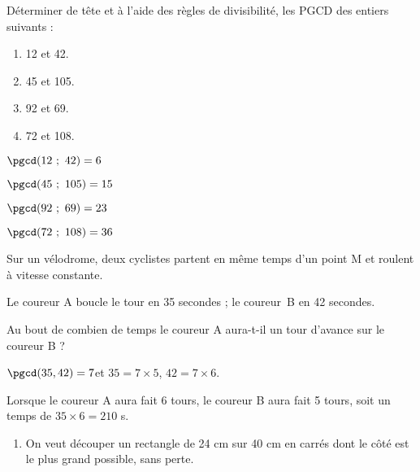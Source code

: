 \documentclass{cornouaille}
\begin{document}
\begin{colonne*exercice}


\begin{exercice*}
Déterminer de tête et à l’aide des règles de divisibilité,
les PGCD des entiers suivants :

\vspace{-2mm}
\begin{multicols}{2}
\begin{enumerate}
\item 12 et 42.
\item 45 et 105.
\item 92 et 69.
\item 72 et 108.
\end{enumerate}
\end{multicols}
\end{exercice*}
\begin{corrige}
\begin{colenumerate}{2}
\item $\pgcd(12\ ;\ 42)=6$
\item $\pgcd(45\ ;\ 105)=15$
\item $\pgcd(92\ ;\ 69)=23$
\item $\pgcd(72\ ;\ 108)=36$
\end{colenumerate}
\end{corrige}

\begin{exercice*}
Sur un vélodrome, deux cyclistes partent en même temps d’un point M et roulent à vitesse
constante.

Le coureur A boucle le tour en 35 secondes ; le coureur~B en 42
secondes.

Au bout de combien de temps le coureur A aura-t-il un tour d’avance sur le coureur B ?
\end{exercice*}
\begin{corrige}
  $\pgcd(35,42)=7$\enskip et \enskip $35=7\times5$,\enskip
  $42=7\times6$.

  Lorsque le coureur A aura fait 6 tours, le coureur B aura fait 5
  tours, soit un temps de \enskip $35\times 6=210$ s.
\end{corrige}

\begin{exercice*}
\begin{enumerate}
\item On veut découper un rectangle de 24 cm sur 40 cm en carrés dont le côté est le plus grand possible, sans perte.


\end{enumerate}
\end{exercice*}
\end{colonne*exercice}
\end{document}
